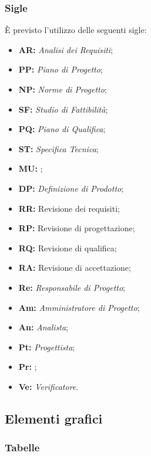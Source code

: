 \documentclass[../NormediProgetto.tex]{subfiles}
\begin{document}
\subsubsection{Sigle}

È previsto l’utilizzo delle seguenti sigle: 

\begin{itemize}
    \item{\textbf{AR:}} \textit{Analisi dei Requisiti};
    \item{\textbf{PP:}} \textit{Piano di Progetto};
    \item{\textbf{NP:}} \textit{Norme di Progetto};
    \item{\textbf{SF:}} \textit{Studio di Fattibilità};
    \item{\textbf{PQ:}} \textit{Piano di Qualifica};
    \item{\textbf{ST:}} \textit{Specifica Tecnica};
    \item{\textbf{MU:}} ;
    \item{\textbf{DP:}} \textit{Definizione di Prodotto};
    \item{\textbf{RR:}} Revisione dei requisiti;
    \item{\textbf{RP:}} Revisione di progettazione;
    \item{\textbf{RQ:}} Revisione di qualifica;
    \item{\textbf{RA:}} Revisione di accettazione;
    \item{\textbf{Re:}} \textit{Responsabile di Progetto};
    \item{\textbf{Am:}} \textit{Amministratore di Progetto};
    \item{\textbf{An:}} \textit{Analista};
    \item{\textbf{Pt:}} \textit{Progettista};
    \item{\textbf{Pr:}} ;
    \item{\textbf{Ve:}} \textit{Verificatore}.
\end{itemize}

\subsection{Elementi grafici}

\subsubsection{Tabelle}
\end{document}
